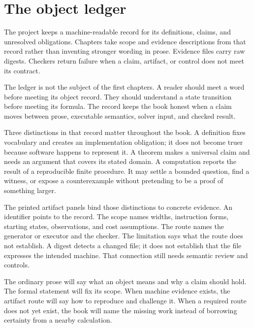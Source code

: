 \section{The object ledger}

The project keeps a machine-readable record for its definitions, claims, and
unresolved obligations. Chapters take scope and evidence descriptions from
that record rather than inventing stronger wording in prose. Evidence files
carry raw digests. Checkers return failure when a claim, artifact, or control
does not meet its contract.

The ledger is not the subject of the first chapters. A reader should meet a
word before meeting its object record. They should understand a state
transition before meeting its formula. The record keeps the book honest when a
claim moves between prose, executable semantics, solver input, and checked
result.

Three distinctions in that record matter throughout the book. A definition
fixes vocabulary and creates an implementation obligation; it does not become
truer because software happens to represent it. A theorem makes a universal
claim and needs an argument that covers its stated domain. A computation
reports the result of a reproducible finite procedure. It may settle a bounded
question, find a witness, or expose a counterexample without pretending to be
a proof of something larger.

The printed artifact panels bind those distinctions to concrete evidence. An
identifier points to the record. The scope names widths, instruction forms,
starting states, observations, and cost assumptions. The route names the
generator or executor and the checker. The limitation says what the route
does not establish. A digest detects a changed file; it does not establish
that the file expresses the intended machine. That connection still needs
semantic review and controls.

\begin{keyidea}[title={Every chapter makes the same promise}]
The ordinary prose will say what an object means and why a claim should hold.
The formal statement will fix its scope. When machine evidence exists, the
artifact route will say how to reproduce and challenge it. When a required
route does not yet exist, the book will name the missing work instead of
borrowing certainty from a nearby calculation.
\end{keyidea}

